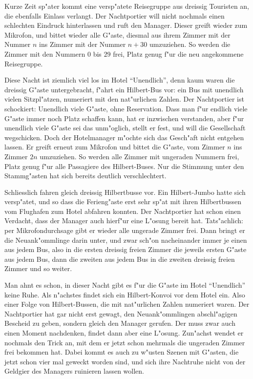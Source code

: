 Kurze Zeit sp"ater kommt eine versp"atete Reisegruppe aus dreissig
Touristen an, die ebenfalls
Einlass verlangt. Der Nachtportier will nicht nochmals einen schlechten
Eindruck hinterlassen und ruft den Manager. Dieser greift
wieder zum Mikrofon, und bittet wieder alle G"aste, diesmal aus
ihrem Zimmer mit der Nummer $n$ ins Zimmer mit der Nummer $n+30$
umzuziehen. So werden die Zimmer mit den Nummern $0$ bis $29$ frei,
Platz genug f"ur die neu angekommene Reisegruppe.

Diese Nacht ist ziemlich viel los im Hotel ``Unendlich'', denn
kaum waren die dreissig G"aste untergebracht, f"ahrt ein Hilbert-Bus
vor: ein Bus mit unendlich vielen Sitzpl"atzen, numeriert mit den
nat"urlichen Zahlen. Der Nachtportier ist schockiert: Unendlich
viele G"aste, ohne Reservation. Dass man f"ur endlich viele G"aste
immer noch Platz schaffen kann, hat er inzwischen verstanden, aber
f"ur unendlich viele G"aste sei das unm"oglich, stellt er fest, und
will die Gesellschaft wegschicken. Doch der Hotelmanager m"ochte
sich das Gesch"aft nicht entgehen lassen. Er greift erneut zum
Mikrofon und bittet die G"aste, vom Zimmer $n$ ins Zimmer $2n$ umzuziehen.
So werden alle Zimmer mit ungeraden Nummern frei, Platz genug f"ur alle
Passagiere des Hilbert-Buses. Nur die Stimmung unter den Stammg"asten
hat sich bereits deutlich verschlechtert.

Schliesslich fahren gleich dreissig Hilbertbusse vor. Ein Hilbert-Jumbo
hatte sich versp"atet, und so dass die Ferieng"aste erst sehr sp"at
mit ihren Hilbertbussen vom Flughafen zum Hotel abfahren konnten.
Der Nachtportier hat schon einen Verdacht, dass der Manager auch
hierf"ur eine L"osung bereit hat. Tats"achlich: per Mikrofondurchsage
gibt er wieder alle ungerade Zimmer frei. Dann bringt er die Neuank"ommlinge
darin unter, und zwar sch"on nacheinander immer je einen aus jedem Bus,
also in die ersten dreissig freien Zimmer die jeweils ersten G"aste
aus jedem Bus, dann die zweiten aus jedem Bus in die zweiten dreissig
freien Zimmer und so weiter.

Man ahnt es schon, in dieser Nacht gibt es f"ur die G"aste im Hotel
``Unendlich'' keine Ruhe. Als n"achstes findet sich ein Hilbert-Konvoi
vor dem Hotel ein. Also einer Folge von Hilbert-Bussen, die mit nat"urlichen
Zahlen numeriert waren. Der Nachtportier hat gar nicht erst gewagt,
den Neuank"ommlingen abschl"agigen Bescheid zu geben, sondern gleich
den Manager gerufen. Der muss zwar auch einen Moment nachdenken, findet
dann aber eine L"osung. Zun"achst wendet er nochmals den Trick an,
mit dem er jetzt schon mehrmals die ungeraden Zimmer frei bekommen hat.
Dabei kommt es auch zu w"usten Szenen mit G"asten, die jetzt schon vier mal
geweckt worden sind, und sich ihre Nachtruhe nicht von der Geldgier des
Managers ruinieren lassen wollen.

